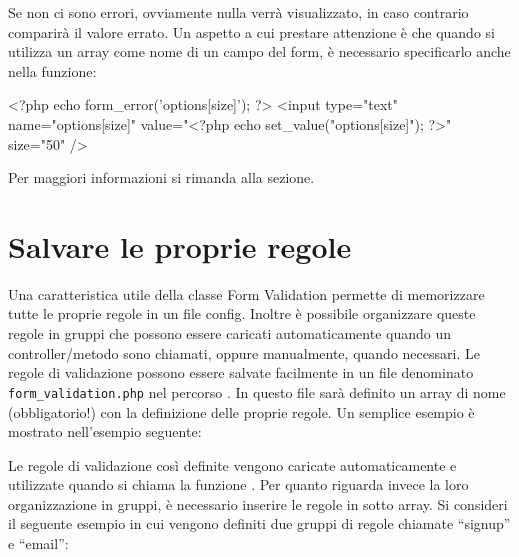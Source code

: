 Se non ci sono errori, ovviamente nulla verrà visualizzato, in caso contrario comparirà il valore errato. Un aspetto a cui prestare attenzione è che quando si utilizza un array come nome di un campo del form, è necessario specificarlo anche nella funzione:

\begin{code}
<?php echo form_error('options[size]'); ?>
<input type="text" name="options[size]" value="<?php echo set_value("options[size]"); ?>" size="50" />
\end{code}

Per maggiori informazioni si rimanda alla sezione.

\section*{Salvare le proprie regole}
Una caratteristica utile della classe Form Validation permette di memorizzare tutte le proprie regole in un file config. Inoltre è possibile organizzare queste regole in gruppi che possono essere caricati automaticamente quando un controller/metodo sono chiamati, oppure manualmente, quando necessari. Le regole di validazione possono essere salvate facilmente in un file denominato \verb|form_validation.php| nel percorso . In questo file sarà definito un array di nome (obbligatorio!)  con la definizione delle proprie regole. Un semplice esempio è mostrato nell'esempio seguente:


Le regole di validazione così definite vengono caricate automaticamente e utilizzate quando si chiama la funzione . Per quanto riguarda invece la loro organizzazione in gruppi, è necessario inserire le regole in sotto array. Si consideri il seguente esempio in cui vengono definiti due gruppi di regole chiamate ``signup'' e ``email'':

